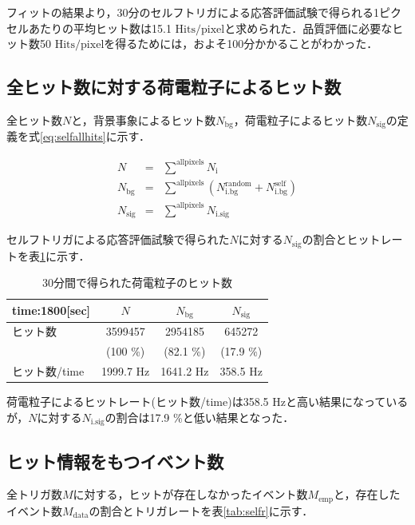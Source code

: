 フィットの結果より，30分のセルフトリガによる応答評価試験で得られる1ピクセルあたりの平均ヒット数は15.1 $\mathrm{Hits/pixel}$と求められた．品質評価に必要なヒット数50 $\mathrm{Hits/pixel}$を得るためには，およそ100分かかることがわかった．

\subsection*{全ヒット数に対する荷電粒子によるヒット数}
全ヒット数$N$と，背景事象によるヒット数$N_{\mathrm{bg}}$，荷電粒子によるヒット数$N_{\mathrm{sig}}$の定義を式\ref{eq:selfallhits}に示す．

\begin{eqnarray}
  N &=& \sum^{\mathrm{allpixels}} N_{\mathrm{i}} \\
  N_{\mathrm{bg}} &=& \sum^{\mathrm{allpixels}} \left(N_{\mathrm{i.bg}}^{\mathrm{random}} + N_{\mathrm{i.bg}}^{\mathrm{self}} \right) \\
  N_{\mathrm{sig}} &=& \sum^{\mathrm{allpixels}} N_{\mathrm{i.sig}}
\end{eqnarray}

セルフトリガによる応答評価試験で得られた$N$に対する$N_{\mathrm{sig}}$の割合とヒットレートを表\ref{tab:selfp}に示す．
\begin{table}[h]
  \centering
  \caption{30分間で得られた荷電粒子のヒット数}
  \begin{tabular} {l|ccc} \hline
    time:1800[sec]& $N$ & $N_{\mathrm{bg}}$ & $N_{\mathrm{sig}}$ \\ \hline
    ヒット数 & 3599457 & 2954185 & 645272 \\
    & (100 \%) & (82.1 \%) & (17.9 \%) \\ \hline
    ヒット数/time & 1999.7 $\mathrm{Hz}$ & 1641.2 $\mathrm{Hz}$ & 358.5 $\mathrm{Hz}$ \\ \hline
  \end{tabular}
  \label{tab:selfp}
\end{table}

荷電粒子によるヒットレート(ヒット数/time)は358.5 $\mathrm{Hz}$と高い結果になっているが，$N$に対する$N_{\mathrm{i.sig}}$の割合は17.9 \%と低い結果となった．

\subsection*{ヒット情報をもつイベント数}
全トリガ数$M$に対する，ヒットが存在しなかったイベント数$M_{\mathrm{emp}}$と，存在したイベント数$M_{\mathrm{data}}$の割合とトリガレートを表\ref{tab:selfr}に示す．

